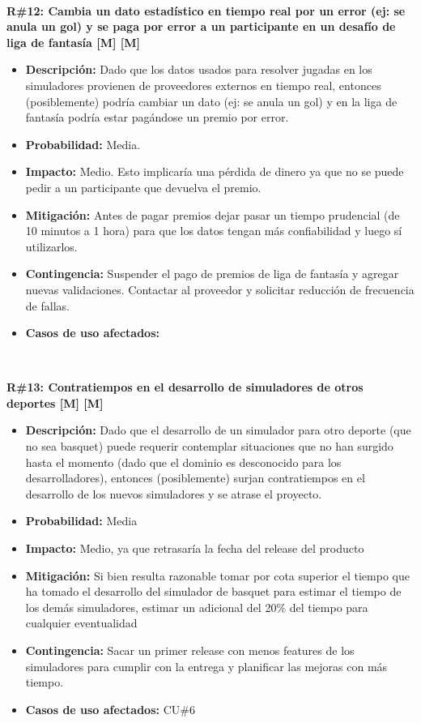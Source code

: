 ~

\noindent\textbf{R\#12: Cambia un dato estadístico en tiempo real por un error (ej: se anula un gol) y se paga por error a un participante en un desafío de liga de fantasía [M] [M] } 
\begin{itemize}
	\item{\textbf{Descripción:} Dado que los datos usados para resolver jugadas en los simuladores provienen de proveedores externos en tiempo real, entonces (posiblemente) podría cambiar un dato (ej: se anula un gol) y en la liga de fantasía podría estar pagándose un premio por error.}
	\item{\textbf{Probabilidad:} Media.}
	\item{\textbf{Impacto:} Medio. Esto implicaría una pérdida de dinero ya que no se puede pedir a un participante que devuelva el premio.}
	\item{\textbf{Mitigación:} Antes de pagar premios dejar pasar un tiempo prudencial (de 10 minutos a 1 hora) para que los datos tengan más confiabilidad y luego sí utilizarlos.}
	\item{\textbf{Contingencia:} Suspender el pago de premios de liga de fantasía y agregar nuevas validaciones. Contactar al proveedor y solicitar reducción de frecuencia de fallas.}
	\item{\textbf{Casos de uso afectados:} }
\end{itemize}

~

\noindent\textbf{R\#13: Contratiempos en el desarrollo de simuladores de otros deportes [M] [M]}
\begin{itemize}
	\item{\textbf{Descripción:} Dado que el desarrollo de un simulador para otro deporte (que no sea basquet) puede requerir contemplar situaciones que no han surgido hasta el momento (dado que el dominio es desconocido para los desarrolladores), entonces (posiblemente) surjan contratiempos en el desarrollo de los nuevos simuladores y se atrase el proyecto.}
	\item{\textbf{Probabilidad:} Media}
	\item{\textbf{Impacto:} Medio, ya que retrasaría la fecha del release del producto}
	\item{\textbf{Mitigación:} Si bien resulta razonable tomar por cota superior el tiempo que ha tomado el desarrollo del simulador de basquet para estimar el tiempo de los demás simuladores, estimar un adicional del 20\% del tiempo para cualquier eventualidad}
	\item{\textbf{Contingencia:} Sacar un primer release con menos features de los simuladores para cumplir con la entrega y planificar las mejoras con más tiempo.}
	\item{\textbf{Casos de uso afectados:} CU\#6}
\end{itemize}

